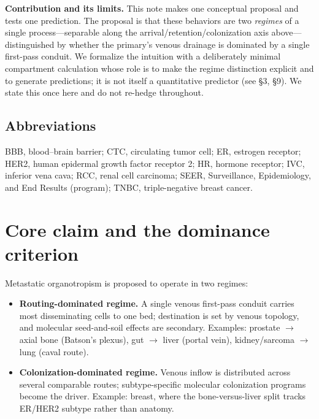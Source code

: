 \documentclass[11pt]{article}
\begin{document}
\textbf{Contribution and its limits.} This note makes one conceptual proposal and
tests one prediction. The proposal is that these behaviors are two \emph{regimes}
of a single process---separable along the arrival/retention/colonization axis
above---distinguished by whether the primary's venous drainage is dominated by a
single first-pass conduit. We formalize the intuition with a deliberately minimal
compartment calculation whose role is to make the regime distinction explicit and
to generate predictions; it is not itself a quantitative predictor (see
\S3, \S9). We state this once here and do not re-hedge throughout.

\subsection*{Abbreviations}
{\footnotesize
BBB, blood--brain barrier; CTC, circulating tumor cell; ER, estrogen receptor;
HER2, human epidermal growth factor receptor 2; HR, hormone receptor;
IVC, inferior vena cava; RCC, renal cell carcinoma; SEER, Surveillance,
Epidemiology, and End Results (program); TNBC, triple-negative breast cancer.}

\section{Core claim and the dominance criterion}

Metastatic organotropism is proposed to operate in two regimes:

\begin{itemize}[leftmargin=1.4em]
  \item \textbf{Routing-dominated regime.} A single venous first-pass conduit
  carries most disseminating cells to one bed; destination is set by venous
  topology, and molecular seed-and-soil effects are secondary. Examples: prostate
  $\to$ axial bone (Batson's plexus), gut $\to$ liver (portal vein),
  kidney/sarcoma $\to$ lung (caval route).
  \item \textbf{Colonization-dominated regime.} Venous inflow is distributed across
  several comparable routes; subtype-specific molecular colonization programs
  become the driver. Example: breast, where the bone-versus-liver split tracks
  ER/HER2 subtype rather than anatomy.
\end{itemize}
\end{document}
